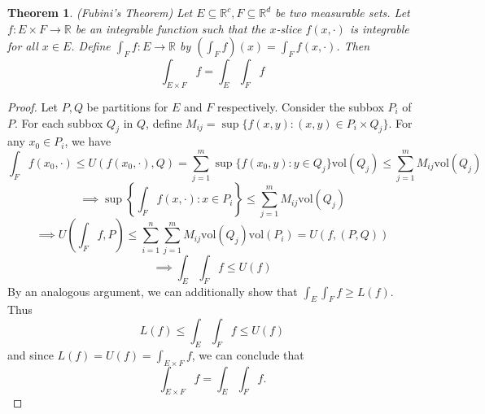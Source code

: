 \documentclass{article}
\newcommand{\vol}{\mathrm{vol}}
\theoremstyle{plain} %
\newtheorem{thm}{Theorem}
\numberwithin{thm}{section} %
\theoremstyle{definition}
\begin{document}
    \begin{thm}
        (Fubini's Theorem) Let \(E \subseteq \mathbb{R}^c, F \subseteq \mathbb{R}^d\) be two measurable sets. Let \(f: E \times F \to \mathbb{R}\) be an integrable function such that the \(x\)-slice \(f(x, \cdot)\) is integrable for all \(x \in E\). Define \(\int _F f : E \to \mathbb{R}\) by \((\int _F f)(x) = \int _F f(x, \cdot)\). Then
        \[
            \int _{E \times F} f = \int _E \int _F f
        \]
    \end{thm}
    \begin{proof}
        Let \(P,Q\) be partitions for \(E\) and \(F\) respectively. Consider the subbox \(P_i\) of \(P\). For each subbox \(Q_j\) in \(Q\), define \(M_{ij} = \sup \{ f(x,y) : (x,y) \in P_i \times Q_j \}\). For any \(x_0 \in P_i\), we have
        \[
            \int _F f(x_0, \cdot) \leq U(f(x_0, \cdot), Q) = \sum_{j=1}^{m} \sup \{ f(x_0, y) : y \in Q_j\} \vol (Q_j) \leq \sum_{j=1}^{m} M_{ij} \vol(Q_j)
        \]
        \[
            \implies \sup \left\{ \int _F f(x, \cdot) : x \in P_i \right\} \leq \sum_{j=1}^{m} M_{ij} \vol(Q_j)
        \]
        \[
            \implies U\left( \int _F f, P \right) \leq \sum_{i=1}^{n} \sum_{j=1}^{m} M_{ij} \vol(Q_j) \vol(P_i) = U(f, (P,Q))
        \]
        \[
            \implies \int _E \int _F f \leq U(f)
        \]
        By an analogous argument, we can additionally show that \(\int _E \int _F f \geq L(f)\). Thus
        \[
            L(f) \leq \int _E \int _F f \leq U(f)
        \]
        and since \(L(f) = U(f) = \int _{E \times F} f\), we can conclude that
        \[
            \int _{E \times F} f = \int _E \int _F f.
        \]
    \end{proof}
\end{document}
